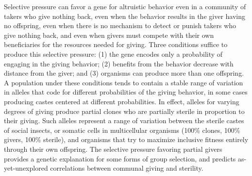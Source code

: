 \documentclass{article}
\begin{document}

Selective pressure can favor a gene for altruistic behavior even in a
community of takers who give nothing back, even when the behavior results in
the giver having no offspring, even when there is no mechanism to detect or
punish takers who give nothing back, and even when givers must compete with
their own beneficiaries for the resources needed for giving. Three conditions
suffice to produce this selective pressure: (1) the gene encodes only a
probability of engaging in the giving behavior; (2) benefits from the behavior
decrease with distance from the giver; and (3) organisms can produce more than
one offspring. A population under these conditions tends to contain a stable
range of variation in alleles that code for different probabilities of the
giving behavior, in some cases producing castes centered at different
probabilities. In effect, alleles for varying degrees of giving produce
partial clones who are partially sterile in proportion to their giving. Such
alleles represent a range of variation between the sterile castes of social
insects, or somatic cells in multicellular organisms (100\% clones, 100\%
givers, 100\% sterile), and organisms that try to maximize inclusive fitness
entirely through their own offspring. The selective pressure favoring partial
givers provides a genetic explanation for some forms of group selection, and
predicts as-yet-unexplored correlations between communal giving and sterility.
\end{document}
